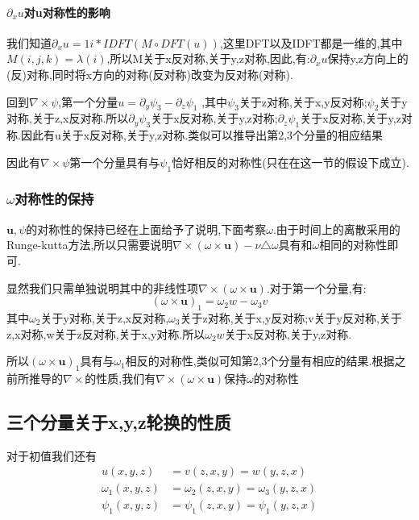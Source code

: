 \documentclass[UTF8]{ctexart}
\begin{document}
\paragraph{$\partial_x u$对u对称性的影响}
我们知道$\partial_x u = 1i *IDFT ( M\circ DFT(u) )$,这里DFT以及IDFT都是一维的,其中$M(i,j,k)= \lambda(i)$,所以M关于x反对称,关于y,z对称,因此,有:$\partial_x u$保持y,z方向上的(反)对称,同时将x方向的对称(反对称)改变为反对称(对称).

回到$\nabla \times \psi$,第一个分量$u=\partial_y \psi_3 -\partial_z \psi_1$ ,其中$\psi_3$关于z对称,关于x,y反对称;$\psi_2$关于y对称,关于z,x反对称.所以$\partial_y \psi_3$关于x反对称,关于y,z对称;$\partial_z \psi_1$关于x反对称,关于y,z对称.因此有u关于x反对称,关于y,z对称.类似可以推导出第2,3个分量的相应结果

因此有$\nabla \times \psi$第一个分量具有与$\psi_1$恰好相反的对称性(只在在这一节的假设下成立).
\subsubsection{$\omega$对称性的保持}
$\mathbf{u},\psi$的对称性的保持已经在上面给予了说明,下面考察$\omega$.由于时间上的离散采用的Runge-kutta方法,所以只需要说明$\nabla\times(\omega\times \mathbf{u}) - \nu \triangle \omega$具有和$\omega$相同的对称性即可.

显然我们只需单独说明其中的非线性项$\nabla\times(\omega\times \mathbf{u})$.对于第一个分量,有:
$$(\omega\times \mathbf{u})_1 = \omega_2w-\omega_3v$$
其中$\omega_2$关于y对称,关于z,x反对称,$\omega_3$关于z对称,关于x,y反对称;v关于y反对称,关于z,x对称,w关于z反对称,关于x,y对称.所以$\omega_2w$关于x反对称,关于y,z对称.

所以$(\omega\times \mathbf{u})_1$具有与$\omega_1$相反的对称性,类似可知第2,3个分量有相应的结果.根据之前所推导的$\nabla\times$的性质,我们有$\nabla\times(\omega\times \mathbf{u})$保持$\omega$的对称性

\subsection{三个分量关于x,y,z轮换的性质}
对于初值我们还有
\begin{equation*}
  \begin{split}
     u(x,y,z) & =v(z,x,y) = w(y,z,x) \\
       \omega_1(x,y,z) & =\omega_2(z,x,y) = \omega_3(y,z,x) \\
       \psi_1(x,y,z) & =\psi_1(z,x,y) = \psi_1(y,z,x)
  \end{split}
\end{equation*}
\end{document}
